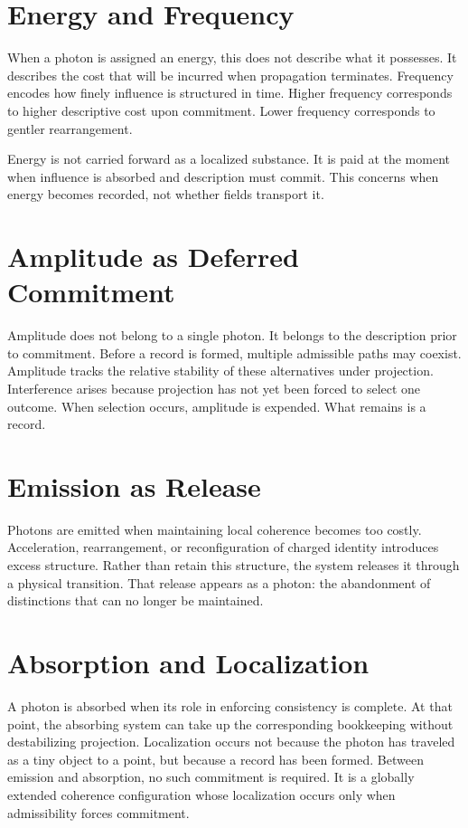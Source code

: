 \documentclass[11pt,twoside,openright]{book}
\begin{document}
\section*{Energy and Frequency}

When a photon is assigned an energy, this does not describe what it possesses. It describes the cost that will be incurred when propagation terminates. Frequency encodes how finely influence is structured in time. Higher frequency corresponds to higher descriptive cost upon commitment. Lower frequency corresponds to gentler rearrangement.

Energy is not carried forward as a localized substance. It is paid at the moment when influence is absorbed and description must commit. This concerns when energy becomes recorded, not whether fields transport it.

\section*{Amplitude as Deferred Commitment}

Amplitude does not belong to a single photon. It belongs to the description prior to commitment. Before a record is formed, multiple admissible paths may coexist. Amplitude tracks the relative stability of these alternatives under projection. Interference arises because projection has not yet been forced to select one outcome. When selection occurs, amplitude is expended. What remains is a record.

\section*{Emission as Release}

Photons are emitted when maintaining local coherence becomes too costly. Acceleration, rearrangement, or reconfiguration of charged identity introduces excess structure. Rather than retain this structure, the system releases it through a physical transition. That release appears as a photon: the abandonment of distinctions that can no longer be maintained.

\section*{Absorption and Localization}

A photon is absorbed when its role in enforcing consistency is complete. At that point, the absorbing system can take up the corresponding bookkeeping without destabilizing projection. Localization occurs not because the photon has traveled as a tiny object to a point, but because a record has been formed. Between emission and absorption, no such commitment is required. It is a globally extended coherence configuration whose localization occurs only when admissibility forces commitment.
\end{document}
